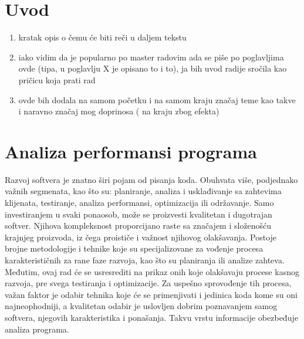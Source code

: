 \documentclass[12pt,oneside]{memoir}
\begin{document}
\frontmatter
\naslovna
\komisija
\apstrakt
\tableofcontents

\mainmatter

\chapter{Uvod}


\begin{enumerate}
\item kratak opis o čemu će biti reči u daljem tekstu
\item iako vidim da je popularno po master radovim ada se piše po poglavljima ovde (tipa, u poglavlju X je opisano to i to), ja bih uvod radije sročila kao pričicu koja prati rad
\item ovde bih dodala na samom početku i na samom kraju značaj teme kao takve i naravno značaj mog doprinosa ( na kraju zbog efekta)
\end{enumerate}


\chapter{Analiza performansi programa}


Razvoj softvera je znatno širi pojam od pisanja koda. Obuhvata više, podjednako važnih segmenata, kao što su: planiranje, analiza i usklađivanje sa zahtevima klijenata, testiranje, analiza performansi, optimizacija ili održavanje. Samo investiranjem u svaki ponaosob, može se proizvesti kvalitetan i dugotrajan softver. Njihova kompleksnost proporcijano raste sa značajem i složenošću krajnjeg proizvoda, iz čega proističe i važnost njihovog olakšavanja. Postoje brojne metodologije i tehnike koje su specijalizovane za vođenje procesa karakterističnih za rane faze razvoja, kao što su planiranja ili analize zahteva. Međutim, ovaj rad će se usresrediti na prikaz onih koje olakšavaju procese kasnog razvoja, pre svega testiranja i optimizacije. Za uspešno sprovođenje tih procesa, važan faktor je odabir tehnika koje će se primenjivati i jedinica koda kome su oni najneophodniji, a kvalitetan odabir je uslovljen dobrim poznavanjem samog softvera, njegovih karakteristika i ponašanja. Takvu vrstu informacije obezbeđuje analiza programa.
\end{document}
